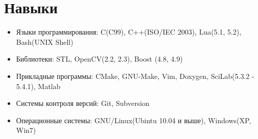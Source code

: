 \documentclass[a4paper, 11pt]{article}
\begin{document}

\section{Навыки}
\begin{itemize}
    \item Языки программирования:   C(C99), C++(ISO/IEC 2003), Lua(5.1, 5.2), Bash(UNIX Shell)
    \item Библиотеки:               STL, OpenCV(2.2, 2.3), Boost (4.8, 4.9)
    \item Прикладные программы:     CMake, GNU-Make, Vim, Doxygen, SciLab(5.3.2 - 5.4.1), Matlab
    \item Системы контроля версий:  Git, Subversion
    \item Операционные системы:     GNU/Linux(Ubintu 10.04 и выше), Windows(XP, Win7)
\end{itemize}
\end{document}
